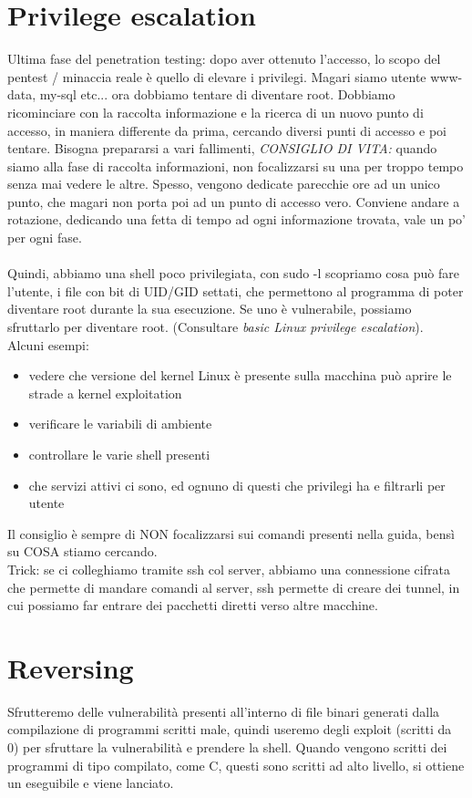 \documentclass{article}
\begin{document}
\section{Privilege escalation}
Ultima fase del penetration testing: dopo aver ottenuto l'accesso, lo scopo del pentest / minaccia reale è quello di elevare i privilegi. Magari siamo utente www-data, my-sql etc... ora dobbiamo tentare di diventare root. Dobbiamo ricominciare con la raccolta informazione e la ricerca di un nuovo punto di accesso, in maniera differente da prima, cercando diversi punti di accesso e poi tentare. Bisogna prepararsi a vari fallimenti, \textit{CONSIGLIO DI VITA: }quando siamo alla fase di raccolta informazioni, non focalizzarsi su una per troppo tempo senza mai vedere le altre. Spesso, vengono dedicate parecchie ore ad un unico punto, che magari non porta poi ad un punto di accesso vero. Conviene andare a rotazione, dedicando una fetta di tempo ad ogni informazione trovata, vale un po' per ogni fase.\\\\ Quindi, abbiamo una shell poco privilegiata, con sudo -l scopriamo cosa può fare l'utente, i file con bit di UID/GID settati, che permettono al programma di poter diventare root durante la sua esecuzione. Se uno è vulnerabile, possiamo sfruttarlo per diventare root. (Consultare \textit{basic Linux privilege escalation}).\\ Alcuni esempi:
\begin{itemize}
\item vedere che versione del kernel Linux è presente sulla macchina può aprire le strade a kernel exploitation
\item verificare le variabili di ambiente
\item controllare le varie shell presenti
\item che servizi attivi ci sono, ed ognuno di questi che privilegi ha e filtrarli per utente
\end{itemize}
Il consiglio è sempre di NON focalizzarsi sui comandi presenti nella guida, bensì su COSA stiamo cercando.\\ Trick: se ci colleghiamo tramite ssh col server, abbiamo una connessione cifrata che permette di mandare comandi al server, ssh permette di creare dei tunnel, in cui possiamo far entrare dei pacchetti diretti verso altre macchine.
\section{Reversing}
Sfrutteremo delle vulnerabilità presenti all'interno di file binari generati dalla compilazione di programmi scritti male, quindi useremo degli exploit (scritti da 0) per sfruttare la vulnerabilità e prendere la shell. Quando vengono scritti dei programmi di tipo compilato, come C, questi sono scritti ad alto livello, si ottiene un eseguibile e viene lanciato. 
\end{document}
